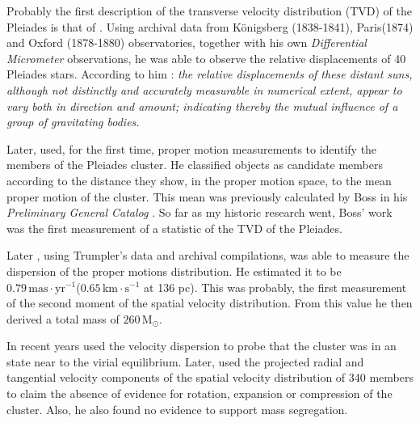 Probably the first description of the transverse velocity distribution (TVD) of the Pleiades is that of \citet{1884MNRAS..44..355P}. Using archival data from  Königsberg (1838-1841), Paris(1874) and Oxford (1878-1880) observatories, together with his own \emph{Differential Micrometer} observations, he was able to observe the relative displacements of 40 Pleiades stars. According to him \citep{1884MNRAS..44..355P}: \textit{the relative displacements of these distant suns, although not distinctly and accurately measurable in numerical extent, appear to vary both in direction and amount; indicating thereby the mutual influence of a group of gravitating bodies.} 

Later, \citet{Trumpler1921} used, for the first time, proper motion measurements to identify the members of the Pleiades cluster. He classified objects as candidate members according to the distance they show, in the proper motion space, to the mean proper motion of the cluster. This mean was previously calculated by Boss in his \emph{Preliminary General Catalog} \citep{1910pgcs.book.....B}. So far as my historic research went, Boss' work was the first measurement of a statistic of the TVD of the Pleiades. 

Later \citet{1938AJ.....47...25T}, using Trumpler's data and archival compilations, was able to measure the dispersion of the proper motions distribution. He estimated it to be $0.79\,\mathrm{mas\cdot yr^{-1}}$($0.65\,\mathrm{ km\cdot s^{-1}}$ at 136 pc). This was probably, the first measurement of the second moment of the spatial velocity distribution. From this value he then derived a total mass of $260\,\mathrm{M_{\odot}}$.

In recent years \citet{Pinfield1998} used the velocity dispersion to probe that the cluster was in an state near to the virial equilibrium. Later, \citet{2006ARep...50..714L} used the projected radial and tangential velocity components of the spatial velocity distribution of 340 members to claim the absence of evidence for rotation, expansion or compression of the cluster. Also, he also found no evidence to support mass segregation. 

